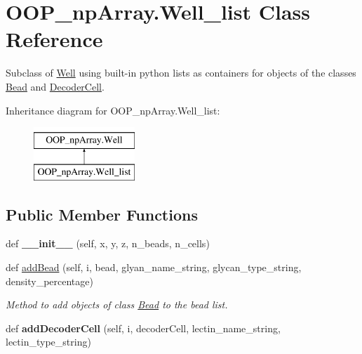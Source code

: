 \hypertarget{class_o_o_p__np_array_1_1_well__list}{}\section{O\+O\+P\+\_\+np\+Array.\+Well\+\_\+list Class Reference}
\label{class_o_o_p__np_array_1_1_well__list}


Subclass of \mbox{\hyperlink{class_o_o_p__np_array_1_1_well}{Well}} using built-\/in python lists as containers for objects of the classes \mbox{\hyperlink{class_o_o_p__np_array_1_1_bead}{Bead}} and \mbox{\hyperlink{class_o_o_p__np_array_1_1_decoder_cell}{Decoder\+Cell}}.  


Inheritance diagram for O\+O\+P\+\_\+np\+Array.\+Well\+\_\+list\+:\begin{figure}[H]
\begin{center}
\leavevmode
\includegraphics[height=2.000000cm]{class_o_o_p__np_array_1_1_well__list}
\end{center}
\end{figure}
\subsection*{Public Member Functions}
\begin{DoxyCompactItemize}
\item 
\mbox{\label{class_o_o_p__np_array_1_1_well__list_a34452e04bc0aa035ca3049b2a4cbe5bd}} 
def {\bfseries \+\_\+\+\_\+init\+\_\+\+\_\+} (self, x, y, z, n\+\_\+beads, n\+\_\+cells)
\item 
def \mbox{\hyperlink{class_o_o_p__np_array_1_1_well__list_ae0961c99dd36f4417bc5c7f3cfe81b67}{add\+Bead}} (self, i, bead, glyan\+\_\+name\+\_\+string, glycan\+\_\+type\+\_\+string, density\+\_\+percentage)
\begin{DoxyCompactList}\small\item\em Method to add objects of class \mbox{\hyperlink{class_o_o_p__np_array_1_1_bead}{Bead}} to the bead list. \end{DoxyCompactList}\item 
\mbox{\label{class_o_o_p__np_array_1_1_well__list_a4faff6c708781f38124239448043117c}} 
def {\bfseries add\+Decoder\+Cell} (self, i, decoder\+Cell, lectin\+\_\+name\+\_\+string, lectin\+\_\+type\+\_\+string)
\end{DoxyCompactItemize}
